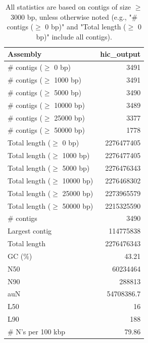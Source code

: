 \documentclass[12pt,a4paper]{article}
\begin{document}
\begin{table}[ht]
\begin{center}
\caption{All statistics are based on contigs of size $\geq$ 3000 bp, unless otherwise noted (e.g., "\# contigs ($\geq$ 0 bp)" and "Total length ($\geq$ 0 bp)" include all contigs).}
\begin{tabular}{|l*{1}{|r}|}
\hline
Assembly & hic\_output \\ \hline
\# contigs ($\geq$ 0 bp) & 3491 \\ \hline
\# contigs ($\geq$ 1000 bp) & 3491 \\ \hline
\# contigs ($\geq$ 5000 bp) & 3490 \\ \hline
\# contigs ($\geq$ 10000 bp) & 3489 \\ \hline
\# contigs ($\geq$ 25000 bp) & 3377 \\ \hline
\# contigs ($\geq$ 50000 bp) & 1778 \\ \hline
Total length ($\geq$ 0 bp) & 2276477405 \\ \hline
Total length ($\geq$ 1000 bp) & 2276477405 \\ \hline
Total length ($\geq$ 5000 bp) & 2276476343 \\ \hline
Total length ($\geq$ 10000 bp) & 2276468302 \\ \hline
Total length ($\geq$ 25000 bp) & 2273965579 \\ \hline
Total length ($\geq$ 50000 bp) & 2215325590 \\ \hline
\# contigs & 3490 \\ \hline
Largest contig & 114775838 \\ \hline
Total length & 2276476343 \\ \hline
GC (\%) & 43.21 \\ \hline
N50 & 60234464 \\ \hline
N90 & 288813 \\ \hline
auN & 54708386.7 \\ \hline
L50 & 16 \\ \hline
L90 & 188 \\ \hline
\# N's per 100 kbp & 79.86 \\ \hline
\end{tabular}
\end{center}
\end{table}
\end{document}
